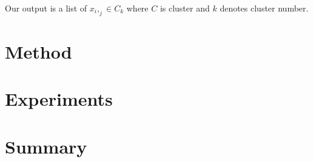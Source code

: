 \documentclass[12pt]{article}
\begin{document}
Our output is a list of $x_i,_j \in C_k$ where $C$ is cluster and $k$ denotes cluster number. 


\section{Method} %
\label{sec:Method}


\section{Experiments} %
\label{sec:Experiments}


\section{Summary} %
\label{sec:Summary}

\end{document}
